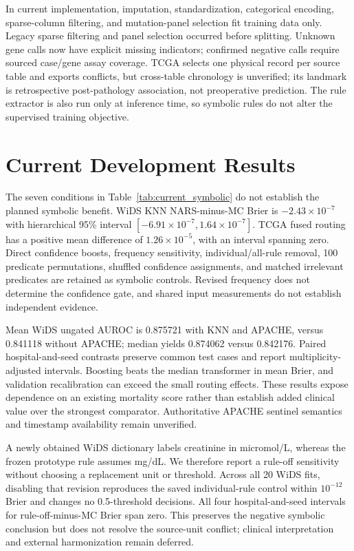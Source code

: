 \documentclass{article}
\begin{document}
In current implementation, imputation, standardization, categorical encoding, sparse-column filtering, and mutation-panel selection fit training data only. Legacy sparse filtering and panel selection occurred before splitting. Unknown gene calls now have explicit missing indicators; confirmed negative calls require sourced case/gene assay coverage. TCGA selects one physical record per source table and exports conflicts, but cross-table chronology is unverified; its landmark is retrospective post-pathology association, not preoperative prediction. The rule extractor is also run only at inference time, so symbolic rules do not alter the supervised training objective.


\section{Current Development Results}
\label{sec:current_results}



The seven conditions in Table~\ref{tab:current_symbolic} do not establish the planned symbolic benefit. WiDS KNN NARS-minus-MC Brier is $-2.43\times10^{-7}$ with hierarchical 95\% interval $[-6.91\times10^{-7},1.64\times10^{-7}]$. TCGA fused routing has a positive mean difference of $1.26\times10^{-5}$, with an interval spanning zero. Direct confidence boosts, frequency sensitivity, individual/all-rule removal, 100 predicate permutations, shuffled confidence assignments, and matched irrelevant predicates are retained as symbolic controls. Revised frequency does not determine the confidence gate, and shared input measurements do not establish independent evidence.

Mean WiDS ungated AUROC is 0.875721 with KNN and APACHE, versus 0.841118 without APACHE; median yields 0.874062 versus 0.842176. Paired hospital-and-seed contrasts preserve common test cases and report multiplicity-adjusted intervals. Boosting beats the median transformer in mean Brier, and validation recalibration can exceed the small routing effects. These results expose dependence on an existing mortality score rather than establish added clinical value over the strongest comparator. Authoritative APACHE sentinel semantics and timestamp availability remain unverified.

A newly obtained WiDS dictionary labels creatinine in micromol/L, whereas the frozen prototype rule assumes mg/dL. We therefore report a rule-off sensitivity without choosing a replacement unit or threshold. Across all 20 WiDS fits, disabling that revision reproduces the saved individual-rule control within $10^{-12}$ Brier and changes no 0.5-threshold decisions. All four hospital-and-seed intervals for rule-off-minus-MC Brier span zero. This preserves the negative symbolic conclusion but does not resolve the source-unit conflict; clinical interpretation and external harmonization remain deferred.
\end{document}
